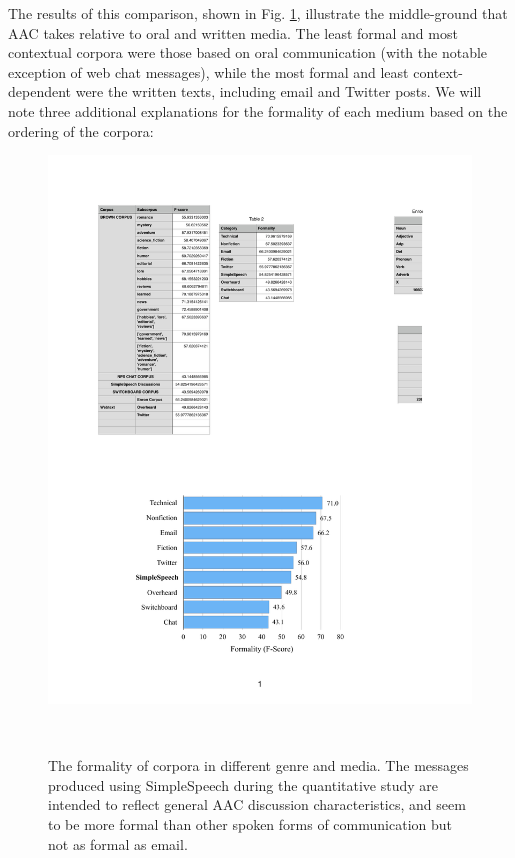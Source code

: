 The results of this comparison, shown in Fig. \ref{fig:formality}, illustrate the middle-ground that AAC takes relative to oral and written media. 
The least formal and most contextual corpora were those based on oral communication (with the notable exception of web chat messages), while the most formal and least context-dependent were the written texts, including email and Twitter posts. 
We will note three additional explanations for the formality of each medium based on the ordering of the corpora:

\begin{figure}
	\centering
	\includegraphics[width=\columnwidth,keepaspectratio]{figures/formality_comparison}
	\caption{The formality of corpora in different genre and media. The messages produced using SimpleSpeech during the quantitative study are intended to reflect general AAC discussion characteristics, and seem to be more formal than other spoken forms of communication but not as formal as email.}~\label{fig:formality}
\end{figure}


